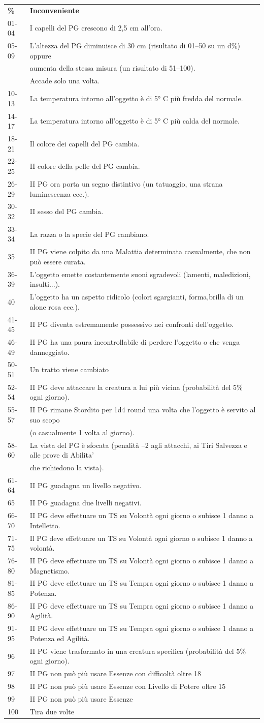 \documentclass[a4paper,11pt,twoside,openany]{book}
\begin{document}
{%
\begin{tabular}{ll}	
\toprule
\textbf{\%} & \textbf{Inconveniente}\tabularnewline
01-04 & I capelli del PG crescono di 2,5 cm all'ora.\tabularnewline
05-09 & L'altezza del PG diminuisce di 30 cm (risultato di 01--50
su un d\%) oppure \\
&aumenta della stessa misura (un risultato di 51--100).\\
&Accade solo una volta.\tabularnewline
10-13 & La temperatura intorno all'oggetto è di 5° C più fredda del normale.\tabularnewline
14-17 & La temperatura intorno all'oggetto è di 5° C più calda del normale.\tabularnewline
18-21 & Il colore dei capelli del PG cambia.\tabularnewline
22-25 & II colore della pelle del PG cambia.\tabularnewline
26-29 & II PG ora porta un segno distintivo (un tatuaggio, una strana
luminescenza ecc.).\tabularnewline
30-32 & II sesso del PG cambia.\tabularnewline
33-34 & La razza o la specie del PG cambiano.\tabularnewline
35 & II PG viene colpito da una Malattia determinata casualmente,
che non può essere curata.\tabularnewline
36-39 & L'oggetto emette costantemente suoni sgradevoli (lamenti, maledizioni, insulti...).\tabularnewline
40 & L'oggetto ha un aspetto ridicolo (colori sgargianti, forma,brilla di un alone rosa ecc.).\tabularnewline
41-45 & II PG diventa estremamente possessivo nei confronti dell'oggetto.\tabularnewline
46-49 & II PG ha una paura incontrollabile di perdere l'oggetto o che venga danneggiato.\tabularnewline
50-51 & Un tratto viene cambiato\tabularnewline
52-54 & II PG deve attaccare la creatura a lui più vicina (probabilità del 5\% ogni giorno).\tabularnewline
55-57 & II PG rimane Stordito per 1d4 round una volta che l'oggetto è servito al suo scopo\\
&(o casualmente 1 volta al giorno).\tabularnewline
58-60 & La vista del PG è sfocata (penalità --2 agli attacchi, ai Tiri Salvezza e alle prove di Abilita'\\
&che richiedono la vista).\tabularnewline
61-64 & II PG guadagna un livello negativo.\tabularnewline
65 & II PG guadagna due livelli negativi.\tabularnewline
66-70 & II PG deve effettuare un TS su Volontà ogni giorno o subisce 1 danno a Intelletto.\tabularnewline
71-75 & Il PG deve effettuare un TS su Volontà ogni giorno o subisce 1 danno a volontà.\tabularnewline
76-80 & II PG deve effettuare un TS su Volontà ogni giorno o subisce 1 danno a Magnetismo.\tabularnewline
81-85 & II PG deve effettuare un TS su Tempra ogni giorno o subisce 1 danno a Potenza.\tabularnewline
86-90 & II PG deve effettuare un TS su Tempra ogni giorno o subisce 1 danno a Agilità.\tabularnewline
91-95 & II PG deve effettuare un TS su Tempra ogni giorno o subisce 1 danno a Potenza ed Agilità.\tabularnewline
96 & II PG viene trasformato in una creatura specifica (probabilità del 5\% ogni giorno).\tabularnewline
97 & II PG non può più usare Essenze con difficoltà oltre 18\tabularnewline
98 & II PG non può più usare Essenze con Livello di Potere oltre 15\tabularnewline
99 & II PG non può più usare Essenze\tabularnewline
100 & Tira due volte\tabularnewline


\end{tabular}}
\end{document}
